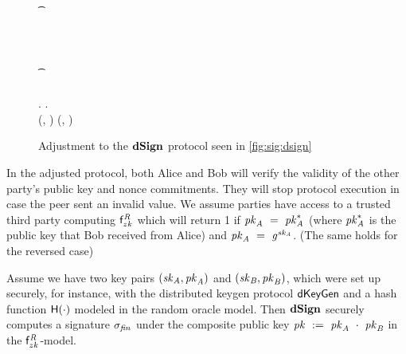 \begin{figure}
\begin{center}
{\begin{varwidth}{\textwidth}
{            \pcif \procVerfPtSig{\varSigBob}{\varMsg}{\varPubKeyBob}  \< \< \\
            \t \pcreturn \cnstFalsum \< \< \\
            \varSigAlice \opFunResult \procSignPrt{\varMsg}{\varSecKeyAlice}{\varNonceAlice}{\varSigContext} \< \< \\
            \< \sendmessageright*{\varSigAlice} \< \\
            \< \< \pcif \procVerfPtSig{\varSigAlice}{\varMsg}{\varPubKeyAlice}  \\
            \< \< \t \pcreturn \cnstFalsum \\
            \varSigFin \opFunResult \procFinSig{\varSigAlice}{\varSigBob} \< \< \varSigFin \opFunResult \procFinSig{\varSigAlice}{\varSigBob} \\
            \varPubKey \opFunResult \varSigContext.\varPubKey \< \< \varPubKey \opFunResult \varSigContext.\varPubKey \\
            \pcreturn (\varSigFin, \varPubKey) \< \< \pcreturn (\varSigFin, \varPubKey)
            }
        \end{varwidth}
        }
    \end{center}
    \caption{Adjustment to the $\mathbf{dSign}$ protocol seen in \cref{fig:sig:dsign}} \label{fig:sig:dsign-adj}
\end{figure}


In the adjusted protocol, both Alice and Bob will verify the validity of the other party's public key and nonce commitments.
They will stop protocol execution in case the peer sent an invalid value.
We assume parties have access to a trusted third party computing $\mathsf{f}^{\mathit{R}}_{zk}$ which will return 1 if $\mathit{pk}_{\mathit{A}} ~=~ \mathit{pk}_{\mathit{A}}^*$ (where $\mathit{pk}_{\mathit{A}}^*$ is the public key that Bob received from Alice) and $\mathit{pk}_{\mathit{A}} ~=~ \mathit{g}^{\mathit{sk}_{\mathit{A}}}$. (The same holds for the reversed case)

\begin{theorem}\label{lem:sig:dsign}
Assume we have two key pairs $(\mathit{sk}_{\mathit{A}}, \mathit{pk}_{\mathit{A}})$ and $(\mathit{sk}_{\mathit{B}}, \mathit{pk}_{\mathit{B}})$, which were set up securely, for instance, with the distributed keygen protocol $\mathsf{dKeyGen}$ and a hash function $\mathsf{H} (\cdot)$ modeled in the random oracle model.
    Then $\mathbf{dSign}$ securely computes a signature $\sigma_{\mathit{fin}}$ under the composite public key $\mathit{pk} ~:=~ \mathit{pk}_{\mathit{A}} ~\cdot~ \mathit{pk}_{\mathit{B}}$ in the $\mathsf{f}^{\mathit{R}}_{zk}$-model.
\end{theorem}

